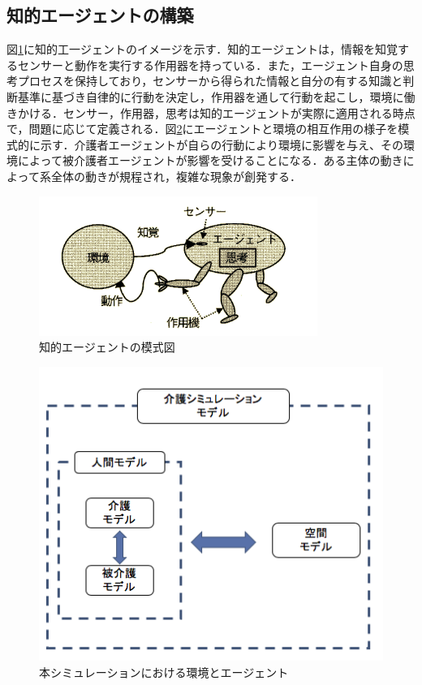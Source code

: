 \subsection{知的エージェントの構築}
図\ref{intelligent_agent}に知的工一ジェントのイメージを示す．知的エージェントは，情報を知覚するセンサーと動作を実行する作用器を持っている．また，エージェント自身の思考プロセスを保持しており，センサーから得られた情報と自分の有する知識と判断基準に基づき自律的に行動を決定し，作用器を通して行動を起こし，環境に働きかける．センサー，作用器，思考は知的エージェントが実際に適用される時点で，問題に応じて定義される．図\ref{agent_modeling}にエージェントと環境の相互作用の様子を模式的に示す．介護者エージェントが自らの行動により環境に影響を与え、その環境によって被介護者エージェントが影響を受けることになる．ある主体の動きによって系全体の動きが規程され，複雑な現象が創発する．

\begin{figure}[htb]
\begin{center}
 \includegraphics[scale=0.6]{figures/intelligent_agent.png}
 \caption[知的エージェントの模式図]{知的エージェントの模式図 \label{intelligent_agent}}
\end{center}
\end{figure}

\begin{figure}[htb]
\begin{center}
 \includegraphics[scale=0.6]{figures/agent_modeling.png}
 \caption[本シミュレーションにおける環境とエージェント]{本シミュレーションにおける環境とエージェント \label{agent_modeling}}
\end{center}
\end{figure}

